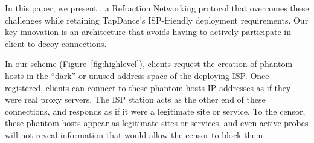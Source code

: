 \documentclass[sigconf]{acmart}
\newcommand{\TODO}[1]{\hl{TODO: #1}\xspace}
\begin{document}



\smallskip

In this paper, we present \textbf{\scheme}, a Refraction
Networking protocol that overcomes these challenges while retaining
TapDance's ISP-friendly deployment requirements.
Our key innovation is an architecture that avoids
having to actively participate in client-to-decoy connections.

In our scheme (Figure~\ref{fig:highlevel}), clients
request the creation of phantom hosts in the ``dark''
or unused address space of the deploying ISP. Once registered, clients
can connect to these phantom hosts IP addresses as if they were real
proxy servers. The ISP station acts as the other end of these connections, and
responds as if it were a legitimate site or service. To the censor,
these phantom hosts appear as legitimate sites or services, and even
active probes will not reveal information that would allow the censor to
block them.


\end{document}
